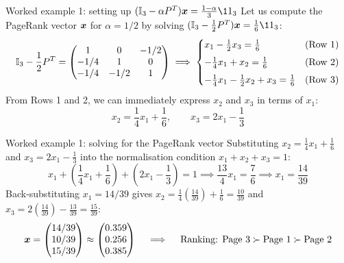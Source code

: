 \documentclass[aspectratio=169]{beamer}\usepackage[]{graphicx}\usepackage[]{xcolor}
\begin{document}
\begin{frame}{Worked example 1: setting up $(\II_3 - \alpha P^T)\bx = \frac{1-\alpha}{3}\11_3$}
Let us compute the PageRank vector $\bm{x}$ for $\alpha = 1/2$ by solving $(\II_3 - \frac{1}{2}P^T)\bx = \frac{1}{6}\11_3$:
\vfill
\[
\mathbb{I}_3 - \frac{1}{2}P^T = \begin{pmatrix}
1 & 0 & -1/2 \\
-1/4 & 1 & 0 \\
-1/4 & -1/2 & 1
\end{pmatrix}
\implies
\begin{cases}
x_1 - \frac{1}{2}x_3 = \frac{1}{6} & \text{(Row 1)} \\[4pt]
-\frac{1}{4}x_1 + x_2 = \frac{1}{6} & \text{(Row 2)} \\[4pt]
-\frac{1}{4}x_1 - \frac{1}{2}x_2 + x_3 = \frac{1}{6} & \text{(Row 3)}
\end{cases}
\]
\vfill
From Rows 1 and 2, we can immediately express $x_2$ and $x_3$ in terms of $x_1$:
\[
x_2 = \frac{1}{4}x_1 + \frac{1}{6}, \qquad x_3 = 2x_1 - \frac{1}{3}
\]
\end{frame}

\begin{frame}{Worked example 1: solving for the PageRank vector}
Substituting $x_2 = \frac{1}{4}x_1 + \frac{1}{6}$ and $x_3 = 2x_1 - \frac{1}{3}$ into the normalisation condition $x_1 + x_2 + x_3 = 1$:
\[
x_1 + \left(\frac{1}{4}x_1 + \frac{1}{6}\right) + \left(2x_1 - \frac{1}{3}\right) = 1
\implies \frac{13}{4}x_1 = \frac{7}{6}
\implies x_1 = \frac{14}{39}
\]
\vfill
Back-substituting $x_1 = 14/39$ gives $x_2 = \frac{1}{4}\left(\frac{14}{39}\right) + \frac{1}{6} = \frac{10}{39}$ and $x_3 = 2\left(\frac{14}{39}\right) - \frac{13}{39} = \frac{15}{39}$:
\[
\bm{x} = \begin{pmatrix} 14/39 \\ 10/39 \\ 15/39 \end{pmatrix} \approx \begin{pmatrix} 0.359 \\ 0.256 \\ 0.385 \end{pmatrix} \quad \implies \quad \text{Ranking: Page } 3 \succ \text{Page } 1 \succ \text{Page } 2
\]
\end{frame}
\end{document}
